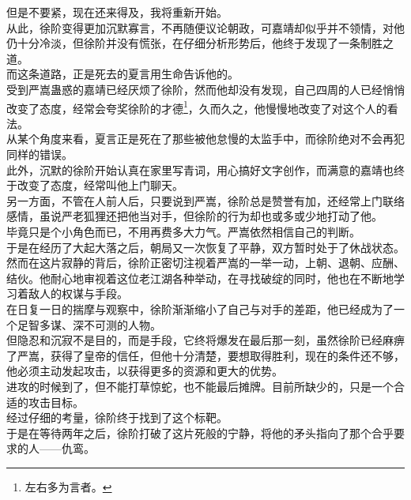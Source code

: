 \begin{multicols}{\theparacolNo}
但是不要紧，现在还来得及，我将重新开始。\\

从此，徐阶变得更加沉默寡言，不再随便议论朝政，可嘉靖却似乎并不领情，对他仍十分冷淡，但徐阶并没有慌张，在仔细分析形势后，他终于发现了一条制胜之道。\\

而这条道路，正是死去的夏言用生命告诉他的。\\

受到严嵩蛊惑的嘉靖已经厌烦了徐阶，然而他却没有发现，自己四周的人已经悄悄改变了态度，经常会夸奖徐阶的才德\footnote{左右多为言者。}，久而久之，他慢慢地改变了对这个人的看法。\\

从某个角度来看，夏言正是死在了那些被他怠慢的太监手中，而徐阶绝对不会再犯同样的错误。\\

此外，沉默的徐阶开始认真在家里写青词，用心搞好文字创作，而满意的嘉靖也终于改变了态度，经常叫他上门聊天。\\

另一方面，不管在人前人后，只要说到严嵩，徐阶总是赞誉有加，还经常上门联络感情，虽说严老狐狸还把他当对手，但徐阶的行为却也或多或少地打动了他。\\

毕竟只是个小角色而已，不用再费多大力气。严嵩依然相信自己的判断。\\

于是在经历了大起大落之后，朝局又一次恢复了平静，双方暂时处于了休战状态。\\

然而在这片寂静的背后，徐阶正密切注视着严嵩的一举一动，上朝、退朝、应酬、结伙。他耐心地审视着这位老江湖各种举动，在寻找破绽的同时，他也在不断地学习着敌人的权谋与手段。\\

在日复一日的揣摩与观察中，徐阶渐渐缩小了自己与对手的差距，他已经成为了一个足智多谋、深不可测的人物。\\

但隐忍和沉寂不是目的，而是手段，它终将爆发在最后那一刻，虽然徐阶已经麻痹了严嵩，获得了皇帝的信任，但他十分清楚，要想取得胜利，现在的条件还不够，他必须主动发起攻击，以获得更多的资源和更大的优势。\\

进攻的时候到了，但不能打草惊蛇，也不能最后摊牌。目前所缺少的，只是一个合适的攻击目标。\\

经过仔细的考量，徐阶终于找到了这个标靶。\\

于是在等待两年之后，徐阶打破了这片死般的宁静，将他的矛头指向了那个合乎要求的人——仇鸾。\\
\ifnum{}
	\end{multicols}
\fi
\newpage
